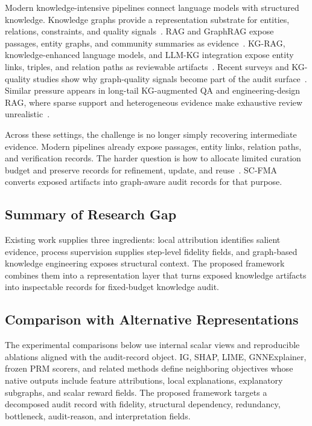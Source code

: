\documentclass[pdflatex,sn-mathphys-num,iicol]{sn-jnl}
\begin{document}
Modern knowledge-intensive pipelines connect language models with structured knowledge. Knowledge graphs provide a representation substrate for entities, relations, constraints, and quality signals~\cite{hogan2021knowledge}. RAG and GraphRAG expose passages, entity graphs, and community summaries as evidence~\cite{lewis2020rag,gao2023ragsurvey,edge2024graphrag}. KG-RAG, knowledge-enhanced language models, and LLM-KG integration expose entity links, triples, and relation paths as reviewable artifacts~\cite{sanmartin2024kgrag,hu2024knowledgeenhanced,pan2024unifying}. Recent surveys and KG-quality studies show why graph-quality signals become part of the audit surface~\cite{yang2025kbllmsurvey,chen2025kgquality,dai2025llmkg}. Similar pressure appears in long-tail KG-augmented QA and engineering-design RAG, where sparse support and heterogeneous evidence make exhaustive review unrealistic~\cite{huang2025prompting,siddharth2024retrieval,liu2025knowledgereasoning}.

Across these settings, the challenge is no longer simply recovering intermediate evidence. Modern pipelines already expose passages, entity links, relation paths, and verification records. The harder question is how to allocate limited curation budget and preserve records for refinement, update, and reuse~\cite{paulheim2017knowledge,higgins2008dcc}. SC-FMA converts exposed artifacts into graph-aware audit records for that purpose.

\subsection{Summary of Research Gap}

Existing work supplies three ingredients: local attribution identifies salient evidence, process supervision supplies step-level fidelity fields, and graph-based knowledge engineering exposes structural context. The proposed framework combines them into a representation layer that turns exposed knowledge artifacts into inspectable records for fixed-budget knowledge audit.

\subsection{Comparison with Alternative Representations}

The experimental comparisons below use internal scalar views and reproducible ablations aligned with the audit-record object. IG, SHAP, LIME, GNNExplainer, frozen PRM scorers, and related methods define neighboring objectives whose native outputs include feature attributions, local explanations, explanatory subgraphs, and scalar reward fields. The proposed framework targets a decomposed audit record with fidelity, structural dependency, redundancy, bottleneck, audit-reason, and interpretation fields.
\end{document}
